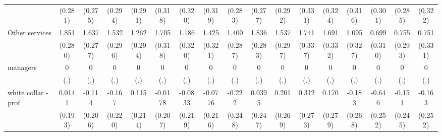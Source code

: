 {\begin{tabular}{l*{16}{c}}
                    &     (0.281)         &     (0.275)         &     (0.294)         &     (0.291)         &     (0.318)         &     (0.320)         &     (0.319)         &     (0.283)         &     (0.277)         &     (0.292)         &     (0.331)         &     (0.324)         &     (0.316)         &     (0.301)         &     (0.285)         &     (0.322)         \\
[1em]
Other services      &       1.851\sym{***}&       1.637\sym{***}&       1.532\sym{***}&       1.262\sym{***}&       1.705\sym{***}&       1.186\sym{***}&       1.425\sym{***}&       1.400\sym{***}&       1.836\sym{***}&       1.537\sym{***}&       1.741\sym{***}&       1.691\sym{***}&       1.095\sym{***}&       0.699\sym{*}  &       0.755\sym{**} &       0.751\sym{*}  \\
                    &     (0.280)         &     (0.277)         &     (0.296)         &     (0.294)         &     (0.318)         &     (0.320)         &     (0.321)         &     (0.287)         &     (0.283)         &     (0.297)         &     (0.337)         &     (0.332)         &     (0.327)         &     (0.310)         &     (0.293)         &     (0.331)         \\
[1em]
managers            &           0         &           0         &           0         &           0         &           0         &           0         &           0         &           0         &           0         &           0         &           0         &           0         &           0         &           0         &           0         &           0         \\
                    &         (.)         &         (.)         &         (.)         &         (.)         &         (.)         &         (.)         &         (.)         &         (.)         &         (.)         &         (.)         &         (.)         &         (.)         &         (.)         &         (.)         &         (.)         &         (.)         \\
[1em]
white collar - prof.&      0.0141         &      -0.114         &      -0.167         &       0.115         &     -0.0178         &     -0.0833         &     -0.0776         &      -0.222         &      0.0395         &       0.201         &       0.312         &       0.170         &      -0.183         &      -0.646\sym{*}  &      -0.151         &      -0.163         \\
                    &     (0.193)         &     (0.206)         &     (0.220)         &     (0.214)         &     (0.207)         &     (0.219)         &     (0.216)         &     (0.248)         &     (0.247)         &     (0.269)         &     (0.273)         &     (0.279)         &     (0.268)         &     (0.252)         &     (0.245)         &     (0.252)         \\

\end{tabular}}
